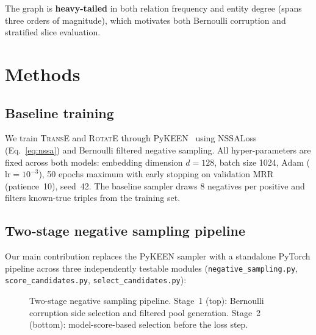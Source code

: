 \documentclass[10pt,twocolumn,letterpaper]{article}
\begin{document}
The graph is \textbf{heavy-tailed} in both relation frequency and entity
degree (spans three orders of magnitude), which motivates both Bernoulli
corruption and stratified slice evaluation.

\section{Methods}
\label{sec:methods}

\subsection{Baseline training}

We train \textsc{TransE} and \textsc{RotatE} through PyKEEN~\cite{ali2021pykeen}
using NSSALoss (Eq.~\ref{eq:nssa}) and Bernoulli filtered negative sampling.
All hyper-parameters are fixed across both models:
embedding dimension $d=128$, batch size 1024, Adam ($\mathrm{lr}=10^{-3}$),
50 epochs maximum with early stopping on validation MRR (patience~10),
seed~42.
The baseline sampler draws 8 negatives per positive and filters known-true
triples from the training set.

\subsection{Two-stage negative sampling pipeline}

Our main contribution replaces the PyKEEN sampler with a standalone PyTorch
pipeline across three independently testable modules
(\texttt{negative\_sampling.py}, \texttt{score\_candidates.py},
\texttt{select\_candidates.py}):

\begin{figure}[ht]
\centering
{}
\caption{Two-stage negative sampling pipeline. Stage~1 (top): Bernoulli
corruption side selection and filtered pool generation. Stage~2 (bottom):
model-score-based selection before the loss step.}
\label{fig:pipeline}
\end{figure}
\end{document}
